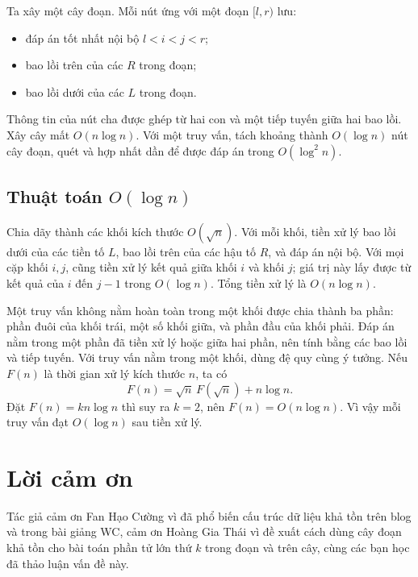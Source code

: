 \documentclass[11pt]{article}
\begin{document}
Ta xây một cây đoạn. Mỗi nút ứng với một đoạn $[l,r)$ lưu:
\begin{itemize}
  \item đáp án tốt nhất nội bộ $l<i<j<r$;
  \item bao lồi trên của các $R$ trong đoạn;
  \item bao lồi dưới của các $L$ trong đoạn.
\end{itemize}
Thông tin của nút cha được ghép từ hai con và một tiếp tuyến giữa hai
bao lồi. Xây cây mất $O(n\log n)$. Với một truy vấn, tách khoảng thành
$O(\log n)$ nút cây đoạn, quét và hợp nhất dần để được đáp án trong
$O(\log^2 n)$.

\subsection{\texorpdfstring{Thuật toán $O(\log n)$}{Thuật toán O log n}}

Chia dãy thành các khối kích thước $O(\sqrt n)$. Với mỗi khối, tiền xử
lý bao lồi dưới của các tiền tố $L$, bao lồi trên của các hậu tố $R$,
và đáp án nội bộ. Với mọi cặp khối $i,j$, cũng tiền xử lý kết quả giữa
khối $i$ và khối $j$; giá trị này lấy được từ kết quả của $i$ đến
$j-1$ trong $O(\log n)$. Tổng tiền xử lý là $O(n\log n)$.

Một truy vấn không nằm hoàn toàn trong một khối được chia thành ba
phần: phần đuôi của khối trái, một số khối giữa, và phần đầu của khối
phải. Đáp án nằm trong một phần đã tiền xử lý hoặc giữa hai phần, nên
tính bằng các bao lồi và tiếp tuyến. Với truy vấn nằm trong một khối,
dùng đệ quy cùng ý tưởng. Nếu $F(n)$ là thời gian xử lý kích thước $n$,
ta có
\[
  F(n)=\sqrt n\,F(\sqrt n)+n\log n.
\]
Đặt $F(n)=kn\log n$ thì suy ra $k=2$, nên $F(n)=O(n\log n)$. Vì vậy
mỗi truy vấn đạt $O(\log n)$ sau tiền xử lý.

\section{Lời cảm ơn}

Tác giả cảm ơn Fan Hạo Cường vì đã phổ biến cấu trúc dữ liệu khả tồn
trên blog và trong bài giảng WC, cảm ơn Hoàng Gia Thái vì đề xuất cách
dùng cây đoạn khả tồn cho bài toán phần tử lớn thứ $k$ trong đoạn và
trên cây, cùng các bạn học đã thảo luận vấn đề này.
\end{document}
